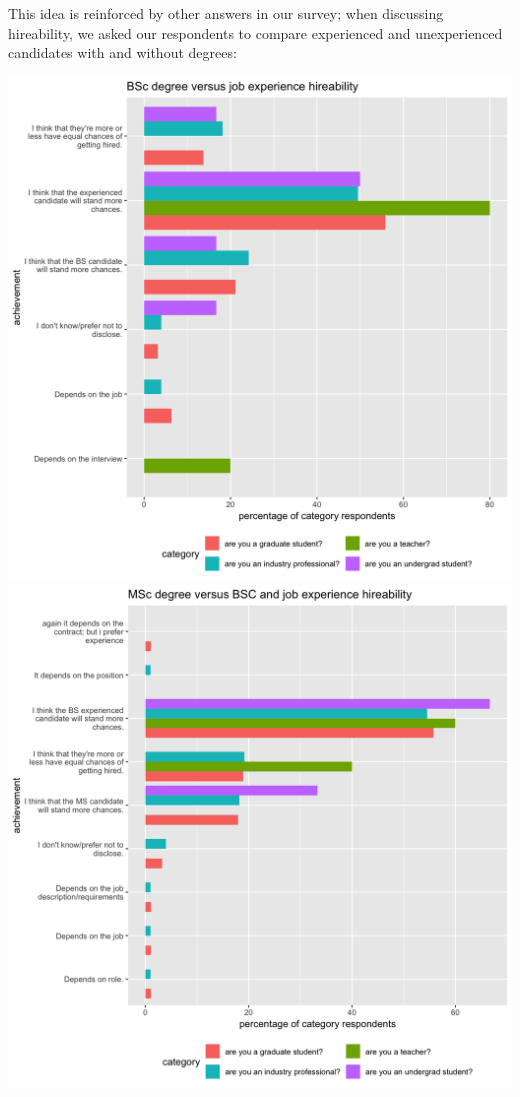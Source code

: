 \documentclass{sigchi}
\begin{document}
This idea is reinforced by other answers in our survey; when discussing hireability, we asked our respondents to compare experienced and unexperienced candidates with and without degrees:

\includegraphics[scale=0.2]{../data-analysis/plots_output/BSc_degree_versus_job_experience_hireability.png}
\includegraphics[scale=0.2]{../data-analysis/plots_output/MSc_degree_versus_BSC_and_job_experience_hireability.png}
\end{document}
